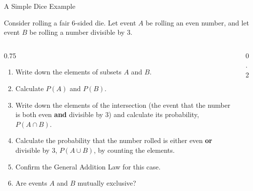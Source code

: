 \begin{frame}{A Simple Dice Example}
    \begin{example}
        Consider rolling a fair 6-sided die. Let event $A$ be rolling an even number, and let event $B$ be rolling a number divisible by 3.
        
        
        \begin{columns}[T, onlytextwidth] 
            \begin{column}{0.75\textwidth} 
                \begin{enumerate}
                    \item Write down the elements of subsets $A$ and $B$.
                    \item Calculate $P(A)$ and $P(B)$.
                    \item Write down the elements of the intersection (the event that the number is both even \textbf{and} divisible by 3) and calculate its probability, $P(A \cap B)$.
                    \item Calculate the probability that the number rolled is either even \textbf{or} divisible by 3, $P(A \cup B)$, by counting the elements.
                    \item Confirm the General Addition Law for this case.
                    \item Are events $A$ and $B$ mutually exclusive?
                \end{enumerate}  
            \end{column}
            
            \begin{column}{0.2\textwidth} 
            \end{column}
        \end{columns}
    \end{example}
\end{frame}


